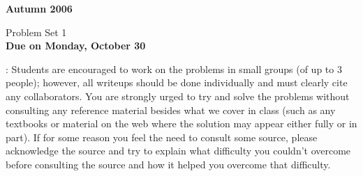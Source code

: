 \documentclass[11pt]{article}
\begin{document}
  {\hfill {\bf Autumn 2006}}
\begin{center}
{\sc Problem Set 1} \\
{\bf Due on Monday, October 30} \\
\end{center}

\hline

\bigskip

: Students are encouraged to work on
the problems in small groups (of up to 3 people); however, all
writeups should be done individually and must clearly cite any
collaborators. You are strongly urged to try and solve the problems
without consulting any reference material besides what we cover in
class (such as any textbooks or material on the web where the solution
may appear either fully or in part). If for some reason you feel the
need to consult some source, please acknowledge the source and try to
explain what difficulty you couldn't overcome before consulting the
source and how it helped you overcome that difficulty. \\

\hline

\bigskip
\end{document}
